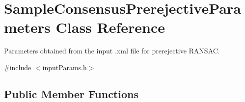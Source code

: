 \hypertarget{classSampleConsensusPrerejectiveParameters}{\section{Sample\-Consensus\-Prerejective\-Parameters Class Reference}
\label{classSampleConsensusPrerejectiveParameters}
}


Parameters obtained from the input .xml file for prerejective R\-A\-N\-S\-A\-C.  




{\ttfamily \#include $<$input\-Params.\-h$>$}

\subsection*{Public Member Functions}
